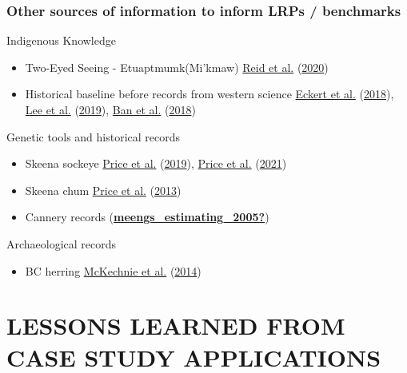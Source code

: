 \documentclass[11pt]{book}
\begin{document}
\hypertarget{other-sources-of-information-to-inform-lrps-benchmarks}{%
\subsubsection{Other sources of information to inform LRPs / benchmarks}\label{other-sources-of-information-to-inform-lrps-benchmarks}}

Indigenous Knowledge
\begin{itemize}

\item
  Two-Eyed Seeing - Etuaptmumk(Mi'kmaw) \protect\hyperlink{ref-reidTwoEyedSeeingIndigenous2020}{Reid et al.} (\protect\hyperlink{ref-reidTwoEyedSeeingIndigenous2020}{2020})
\item
  Historical baseline before records from western science \protect\hyperlink{ref-eckertDivingBackTime2018}{Eckert et al.} (\protect\hyperlink{ref-eckertDivingBackTime2018}{2018}), \protect\hyperlink{ref-leeDiverseKnowledgeSystems2019}{Lee et al.} (\protect\hyperlink{ref-leeDiverseKnowledgeSystems2019}{2019}), \protect\hyperlink{ref-banIncorporateIndigenousPerspectives2018}{Ban et al.} (\protect\hyperlink{ref-banIncorporateIndigenousPerspectives2018}{2018})
\end{itemize}
Genetic tools and historical records
\begin{itemize}

\item
  Skeena sockeye \protect\hyperlink{ref-priceGeneticsCenturyOld2019}{Price et al.} (\protect\hyperlink{ref-priceGeneticsCenturyOld2019}{2019}), \protect\hyperlink{ref-pricePortfolioSimplificationArising2021}{Price et al.} (\protect\hyperlink{ref-pricePortfolioSimplificationArising2021}{2021})
\item
  Skeena chum \protect\hyperlink{ref-priceAbundanceSkeenaRiver2013}{Price et al.} (\protect\hyperlink{ref-priceAbundanceSkeenaRiver2013}{2013})
\item
  Cannery records (\protect\hyperlink{ref-meengs_estimating_2005}{\textbf{meengs\_estimating\_2005?}})
\end{itemize}
Archaeological records
\begin{itemize}

\item
  BC herring \protect\hyperlink{ref-mckechnieArchaeologicalDataProvide2014}{McKechnie et al.} (\protect\hyperlink{ref-mckechnieArchaeologicalDataProvide2014}{2014})
\end{itemize}
\hypertarget{lessons-learned-from-case-study-applications}{%
\section{LESSONS LEARNED FROM CASE STUDY APPLICATIONS}\label{lessons-learned-from-case-study-applications}}
\end{document}
